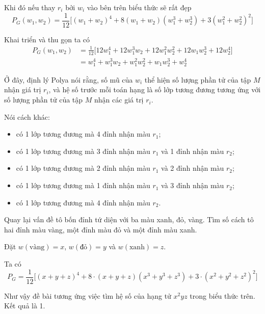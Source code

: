 \begin{example}
    Khi đó nếu thay $r_i$ bởi $w_i$ vào bên trên biểu thức sẽ rất đẹp
    \[P_G(w_1, w_2) = \frac{1}{12} \big[(w_1 + w_2)^4 + 8 (w_1 + w_2) (w_1^3 + w_2^3) + 3 (w_1^2 + w_2^2)^2\big]\]

    Khai triển và thu gọn ta có
    \begin{align*}
    P_G(w_1, w_2) & = \frac{1}{12} \big[12 w_1^4 + 12 w_1^3 w_2 + 12 w_1^2 w_2^2 + 12 w_1 w_2^3 + 12 w_2^4\big] \\
    & = w_1^4 + w_1^3 w_2 + w_1^2 w_2^2 + w_1 w_2^3 + w_2^4
    \end{align*}

    Ở đây, định lý Polya nói rằng, số mũ của $w_i$ thể hiện số lượng phần tử của tập $M$ nhận giá trị $r_i$,
    và hệ số trước mỗi toán hạng là số lớp tương đương tương ứng với số lượng phần tử của tập $M$ nhận các giá trị $r_i$.

    Nói cách khác:
    \begin{itemize}
        \item có 1 lớp tương đương mà 4 đỉnh nhận màu $r_1$;
        \item có 1 lớp tương đương mà 3 đỉnh nhận màu $r_1$ và 1 đỉnh nhận màu $r_2$;
        \item có 1 lớp tương đương mà 2 đỉnh nhận màu $r_1$ và 2 đỉnh nhận màu $r_2$;
        \item có 1 lớp tương đương mà 1 đỉnh nhận màu $r_1$ và 3 đỉnh nhận màu $r_2$;
        \item có 1 lớp tương đương mà 4 đỉnh nhận màu $r_2$.
    \end{itemize}
\end{example}

Quay lại vấn đề tô bốn đỉnh tứ diện với ba màu xanh, đỏ, vàng. Tìm số cách tô hai đỉnh màu vàng, một đỉnh màu đỏ và một đỉnh màu xanh.

Đặt $w(\text{vàng}) = x$, $w(\text{đỏ}) = y$ và $w(\text{xanh}) = z$.

Ta có
\[P_G = \frac{1}{12} \big[(x + y + z)^4 + 8 \cdot (x + y + z) (x^3 + y^3 + z^3) + 3 \cdot (x^2 + y^2 + z^2)^2\big]\]

Như vậy đề bài tương ứng việc tìm hệ số của hạng tử $x^2 yz$ trong biểu thức trên. Kết quả là 1.